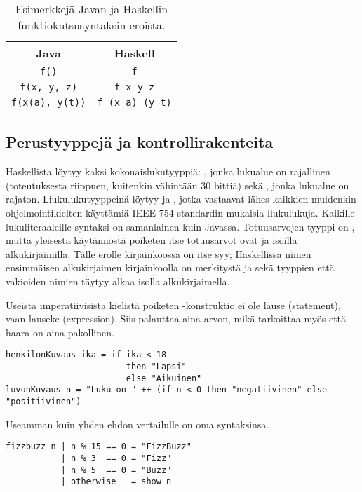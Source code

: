 \begin{table}
    \begin{tabular}[H]{c|c}
        Java                    &   Haskell         \\
        \hline
        \texttt{f()}            &   \texttt{f}              \\
        \texttt{f(x, y, z)}     &   \texttt{f x y z}        \\
        \texttt{f(x(a), y(t))}  &   \texttt{f (x a) (y t)}  \\
    \end{tabular}
    \label{tbl:function-call-examples}
    \caption{Esimerkkejä Javan ja Haskellin funktiokutsusyntaksin eroista.}
\end{table}

\subsection{Perustyyppejä ja kontrollirakenteita}
Haskellista löytyy kaksi kokonaislukutyyppiä: ,
jonka lukualue on rajallinen (toteutuksesta riippuen, kuitenkin vähintään 30 bittiä)
sekä ,
jonka lukualue on rajaton.
Liukulukutyyppeinä löytyy  ja ,
jotka vastaavat lähes kaikkien muidenkin ohjelmointikielten käyttämiä IEEE 754-standardin mukaisia liukulukuja.
Kaikille lukuliteraaleille syntaksi on samanlainen kuin Javassa.
Totuusarvojen tyyppi on ,
mutta yleisestä käytännöstä poiketen itse totuusarvot ovat  ja  isoilla alkukirjaimilla.
Tälle erolle kirjainkoossa on itse syy; Haskellissa nimen ensimmäisen alkukirjaimen kirjainkoolla on merkitystä
ja sekä tyyppien että vakioiden nimien täytyy alkaa isolla alkukirjaimella.

Useista imperatiivisista kielistä poiketen -konstruktio ei ole lause (statement),
vaan lauseke (expression).
Siis  palauttaa aina arvon, mikä tarkoittaa myös että -haara on aina pakollinen.

\begin{verbatim}
henkilonKuvaus ika = if ika < 18
                        then "Lapsi"
                        else "Aikuinen"
luvunKuvaus n = "Luku on " ++ (if n < 0 then "negatiivinen" else "positiivinen")
\end{verbatim}

Useamman kuin yhden ehdon vertailulle on oma syntaksinsa.

\begin{verbatim}
fizzbuzz n | n % 15 == 0 = "FizzBuzz"
           | n % 3  == 0 = "Fizz"
           | n % 5  == 0 = "Buzz"
           | otherwise   = show n
\end{verbatim}

